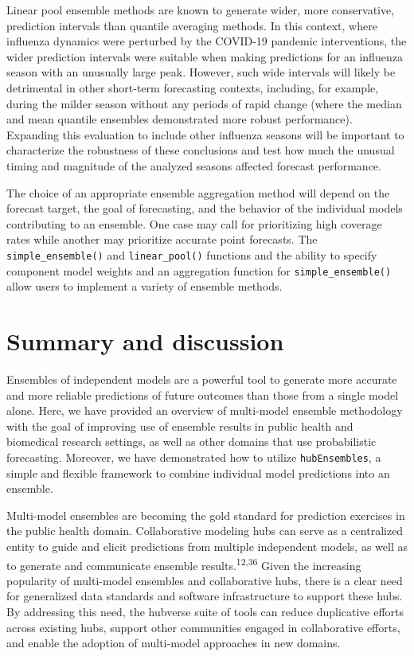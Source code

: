 \documentclass[
]{article}
\begin{document}
Linear pool ensemble methods are known to generate wider, more
conservative, prediction intervals than quantile averaging methods. In
this context, where influenza dynamics were perturbed by the COVID-19
pandemic interventions, the wider prediction intervals were suitable
when making predictions for an influenza season with an unusually large
peak. However, such wide intervals will likely be detrimental in other
short-term forecasting contexts, including, for example, during the
milder season without any periods of rapid change (where the median and
mean quantile ensembles demonstrated more robust performance). Expanding
this evaluation to include other influenza seasons will be important to
characterize the robustness of these conclusions and test how much the
unusual timing and magnitude of the analyzed seasons affected forecast
performance.

The choice of an appropriate ensemble aggregation method will depend on
the forecast target, the goal of forecasting, and the behavior of the
individual models contributing to an ensemble. One case may call for
prioritizing high coverage rates while another may prioritize accurate
point forecasts. The \texttt{simple\_ensemble()} and
\texttt{linear\_pool()} functions and the ability to specify component
model weights and an aggregation function for
\texttt{simple\_ensemble()} allow users to implement a variety of
ensemble methods.

\section{Summary and discussion}\label{sec-conclusions}

Ensembles of independent models are a powerful tool to generate more
accurate and more reliable predictions of future outcomes than those
from a single model alone. Here, we have provided an overview of
multi-model ensemble methodology with the goal of improving use of
ensemble results in public health and biomedical research settings, as
well as other domains that use probabilistic forecasting. Moreover, we
have demonstrated how to utilize \texttt{hubEnsembles}, a simple and
flexible framework to combine individual model predictions into an
ensemble.

Multi-model ensembles are becoming the gold standard for prediction
exercises in the public health domain. Collaborative modeling hubs can
serve as a centralized entity to guide and elicit predictions from
multiple independent models, as well as to generate and communicate
ensemble results.\textsuperscript{12,36} Given the increasing popularity
of multi-model ensembles and collaborative hubs, there is a clear need
for generalized data standards and software infrastructure to support
these hubs. By addressing this need, the hubverse suite of tools can
reduce duplicative efforts across existing hubs, support other
communities engaged in collaborative efforts, and enable the adoption of
multi-model approaches in new domains.
\end{document}
